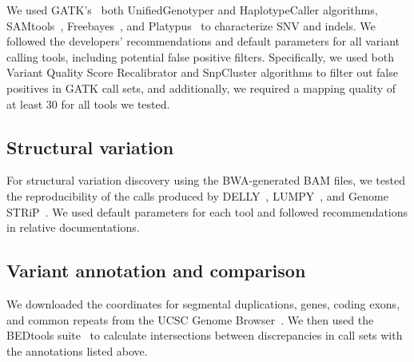 \documentclass[10pt,a4paper]{article}
\begin{document}
We used GATK's~\cite{DePristo2011} both UnifiedGenotyper and HaplotypeCaller algorithms, SAMtools~\cite{Li2009b}, Freebayes~\cite{Garrison2012}, and Platypus~\cite{Rimmer2014} to characterize
SNV and indels. We followed the developers' recommendations and default parameters for all variant calling tools, including potential false positive filters. 
Specifically, we used both Variant Quality Score Recalibrator and SnpCluster algorithms to filter out false positives in GATK call sets, and additionally, 
we required a mapping quality of at least 30 for all tools we tested.

\subsection*{Structural variation}

For structural variation discovery using the BWA-generated BAM files, we tested the reproducibility of the calls produced by DELLY~\cite{Rausch2012}, LUMPY~\cite{Layer2014}, and Genome STRiP~\cite{Handsaker2011,Handsaker2015}. 
We used default parameters for each tool and followed recommendations in relative documentations.


\subsection*{Variant annotation and comparison}

We downloaded the coordinates for segmental duplications, genes, coding exons, and common repeats from the UCSC Genome Browser~\cite{Kent2002}. 
We then used the BEDtools suite~\cite{Quinlan2010a} to calculate intersections between discrepancies in call sets with the annotations listed above.




\end{document}
